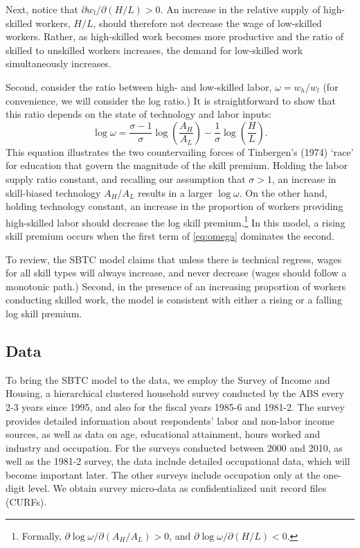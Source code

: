Next, notice that $\partial w_l/\partial(H/L)>0$. An increase in the relative supply of high-skilled workers, $H/L$, should therefore not decrease the wage of low-skilled workers. Rather, as high-skilled work becomes more productive and the ratio of skilled to unskilled workers increases, the demand for low-skilled work simultaneously increases. 

Second, consider the ratio between high- and low-skilled labor, $\omega=w_h/w_l$ (for convenience, we will consider the log ratio.) It is straightforward to show that this ratio depends on the state of technology and labor inputs:
\begin{equation}\label{eq:omega}
\log \omega = \frac{\sigma-1}{\sigma}\log\left(\frac{A_H}{A_L}\right) - \frac{1}{\sigma}\log\left(\frac{H}{L}\right).
\end{equation}
This equation illustrates the two countervailing forces of Tinbergen's (1974) `race' for education that govern the magnitude of the skill premium. Holding the labor supply ratio constant, and recalling our assumption that $\sigma >1$, an increase in skill-biased technology $A_H/A_L$ results in a larger $\log\omega$. On the other hand, holding technology constant, an increase in the proportion of workers providing high-skilled labor should decrease the log skill premium.\footnote{Formally, $\partial \log\omega / \partial(A_H/A_L) > 0$, and 
$\partial \log\omega / \partial(H/L) < 0$.} In this model, a rising skill premium occurs when the first term of \eqref{eq:omega}  dominates the second.

To review, the SBTC model claims that unless there is technical regress, wages for all skill types will always increase, and never decrease (wages should follow a monotonic path.) Second, in the presence of an increasing proportion of workers conducting skilled work, the model is consistent with either a rising or a falling log skill premium.

\subsection{Data}

To bring the SBTC model to the data, we employ the Survey of Income and Housing, a hierarchical clustered household survey conducted by the ABS every 2-3 years since 1995, and also for the fiscal years 1985-6 and 1981-2. The survey provides detailed  information about respondents' labor and non-labor income sources, as well as data on age, educational attainment, hours worked and industry and occupation. For the surveys conducted between 2000 and 2010, as well as the 1981-2 survey, the data include detailed occupational data, which will become important later. The other surveys include occupation only at the one-digit level. We obtain survey micro-data as confidentialized unit record files (CURFs).

